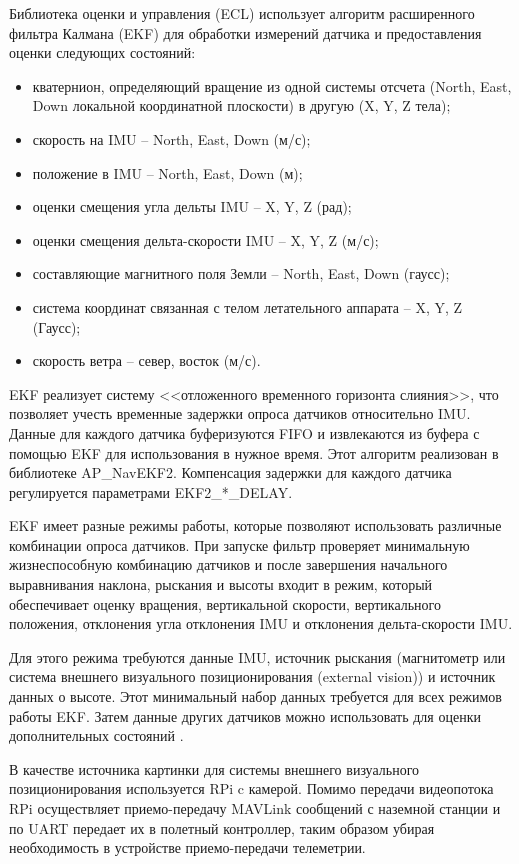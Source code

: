 Библиотека оценки и управления (ECL) использует алгоритм расширенного фильтра Калмана (EKF) для обработки измерений датчика и предоставления оценки следующих состояний:
\begin{itemize}
	\item кватернион, определяющий вращение из одной системы отсчета (North, East, Down локальной координатной плоскости) в другую (X, Y, Z тела);
	\item скорость на IMU -- North, East, Down (м/с);
	\item положение в IMU -- North, East, Down (м);
	\item оценки смещения угла дельты IMU -- X, Y, Z (рад);
	\item оценки смещения дельта-скорости IMU -- X, Y, Z (м/с);
	\item составляющие магнитного поля Земли -- North, East, Down (гаусс);
	\item система координат связанная с телом летательного аппарата -- X, Y, Z (Гаусс);
	\item скорость ветра -- север, восток (м/с).
\end{itemize}

EKF реализует систему <<отложенного временного горизонта слияния>>, что позволяет учесть временные задержки опроса датчиков относительно IMU. Данные для каждого датчика буферизуются FIFO и извлекаются из буфера с помощью EKF для использования в нужное время. Этот алгоритм реализован в библиотеке AP\_NavEKF2. Компенсация задержки для каждого датчика регулируется параметрами EKF2\_*\_DELAY.

EKF имеет разные режимы работы, которые позволяют использовать различные комбинации опроса датчиков. При запуске фильтр проверяет минимальную жизнеспособную комбинацию датчиков и после завершения начального выравнивания наклона, рыскания и высоты входит в режим, который обеспечивает оценку вращения, вертикальной скорости, вертикального положения, отклонения угла отклонения IMU и отклонения дельта-скорости IMU.

Для этого режима требуются данные IMU, источник рыскания (магнитометр или система внешнего визуального позиционирования (external vision)) и источник данных о высоте. Этот минимальный набор данных требуется для всех режимов работы EKF. Затем данные других датчиков можно использовать для оценки дополнительных состояний \cite{px4}.

В качестве источника картинки для системы внешнего визуального позиционирования используется RPi c камерой. Помимо передачи видеопотока RPi осуществляет приемо-передачу MAVLink сообщений с наземной станции и по UART передает их в полетный контроллер, таким образом убирая необходимость в устройстве приемо-передачи телеметрии.


